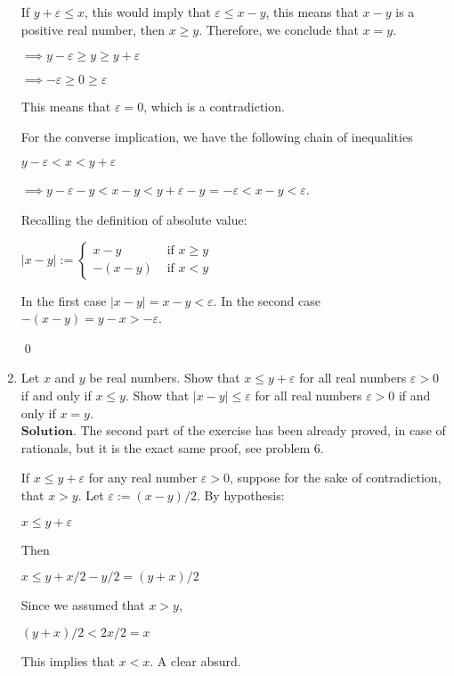 \documentclass{article}
\theoremstyle{remark}
\begin{document}
\begin{enumerate}
        If $y+\varepsilon \leq x$, this would imply that $\varepsilon \leq x-y$, this means that $x-y$ is a positive real number,
        then $x \geq y$.
        Therefore, we conclude that $x = y$.
        \begin{center}
            $\implies y-\varepsilon \geq y \geq y+\varepsilon$
        \end{center}
        \begin{center}
            $\implies -\varepsilon \geq 0 \geq \varepsilon$
        \end{center}
        This means that $\varepsilon = 0$, which is a contradiction.
        
        For the converse implication, we have the following chain of inequalities
        \begin{center}
            $y-\varepsilon < x < y+\varepsilon$
        \end{center}
        \begin{center}
            $\implies y-\varepsilon - y< x - y< y+\varepsilon - y$ = $-\varepsilon < x - y< \varepsilon$. 
        \end{center}
        Recalling the definition of absolute value:
        \begin{center}
            $\vert x-y \vert := 
            \begin{cases}
                x-y & \text{ if } x \geq y\\
                -(x-y) & \text{ if } x < y
            \end{cases}$
        \end{center}
        In the first case $\vert x-y \vert = x-y < \varepsilon$. In the second case $-(x-y) = y-x > -\varepsilon$.
        \begin{flushright}
            \qed
        \end{flushright}

        \item Let \( x \) and \( y \) be real numbers. 
        Show that \( x \leq y + \varepsilon \) for all real numbers \( \varepsilon > 0 \) if and only if \( x \leq y \). 
        Show that \( |x - y| \leq \varepsilon \) for all real numbers \( \varepsilon > 0 \) if and only if \( x = y \).\\
        $\textbf{Solution.}$
        The second part of the exercise has been already proved, in case of rationals, but it is the exact same proof, see 
        problem 6.

        If $x \leq y + \varepsilon$ for any real number $\varepsilon > 0$, suppose for the sake of contradiction, that $x>y$.
        Let $\varepsilon := (x - y)/2$.
        By hypothesis:
        \begin{center}
            $x \leq y + \varepsilon$
        \end{center}
        Then 
        \begin{center}
            $x \leq y + x/2 - y/2 = (y+x)/2$
        \end{center}
        Since we assumed that $x > y$, 
        \begin{center}
            $(y+x)/2 < 2x/2 = x$
        \end{center}
        This implies that $x < x$. A clear absurd.


\end{enumerate}
\end{document}
